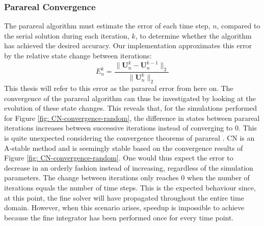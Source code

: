\subsubsection{Parareal Convergence}
\label{sub: convergence parareal}
The parareal algorithm must estimate the error of each time step, $n$, compared to the serial solution during each iteration, $k$, to determine whether the algorithm has achieved the desired accuracy. Our implementation approximates this error by the relative state change between iterations:\[
E^k_n = \frac{\|\textbf{U}^k_n - \textbf{U}^{k-1}_n\|_2}{\|\textbf{U}^k_n\|_2}
\]This thesis will refer to this error as the parareal error from here on. The convergence of the parareal algorithm can thus be investigated by looking at the evolution of these state changes. This reveals that, for the simulations performed for Figure \ref{fig: CN-convergence-random}, the difference in states between parareal iterations increases between successive iterations instead of converging to 0. This is quite unexpected considering the convergence theorems of parareal \cite{gander_analysis_2007}. CN is an A-stable method and is seemingly stable based on the convergence results of Figure \ref{fig: CN-convergence-random}. One would thus expect the error to decrease in an orderly fashion instead of increasing, regardless of the simulation parameters. 
The change between iterations only reaches 0 when the number of iterations equals the number of time steps. This is the expected behaviour since, at this point, the fine solver will have propagated throughout the entire time domain. However, when this scenario arises, speedup is impossible to achieve because the fine integrator has been performed once for every time point. 
